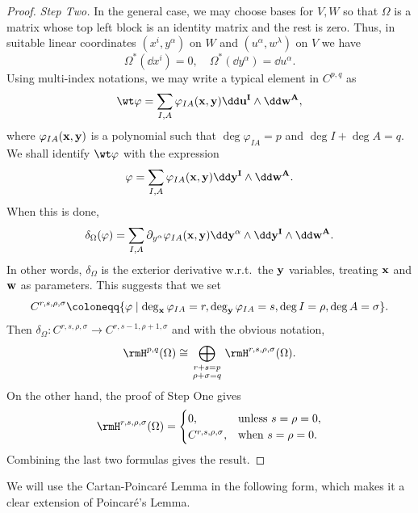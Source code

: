 \begin{proof}
    \emph{Step Two.} In the general case, we may choose bases for $V,W$ so that $\Omega$ is a matrix whose top left block is an identity matrix and the rest is zero. Thus, in suitable linear coordinates $(x^i,y^\alpha)$ on $W$ and $(u^\alpha,w^\lambda)$ on $V$ we have 
    \[\Omega^\ast(\dd x^i)=0,\quad \Omega^\ast(\dd y^\alpha)=\dd u^\alpha.\]
    Using multi-index notations, we may write a typical element in $C^{p,q}$ as 
    \[\wt\varphi=\sum_{I,A}\varphi_{IA}(\bf{x},\bf{y})\dd \bf{u}^I\wedge\dd \bf{w}^A,\]
    where $\varphi_{IA}(\bf{x},\bf{y})$ is a polynomial such that $\deg\varphi_{IA}=p$ and $\deg I+\deg A=q$. We shall identify $\wt\varphi$ with the expression 
    \[\varphi=\sum_{I,A}\varphi_{IA}(\bf{x},\bf{y})\dd \bf{y}^I\wedge\dd \bf{w}^A.\]
    When this is done, 
    \[\delta_\Omega(\varphi)=\sum_{I,A}\partial_{y^\alpha}\varphi_{IA}(\bf{x},\bf{y})\dd y^\alpha\wedge\dd \bf{y}^I\wedge\dd \bf{w}^A.\]
    In other words, $\delta_\Omega$ is the exterior derivative w.r.t.\ the $\bf{y}$ variables, treating $\bf{x}$ and $\bf{w}$ as parameters. This suggests that we set 
    \[C^{r,s,\rho,\sigma}\coloneqq \{\varphi\mid \deg_{\bf{x}}\varphi_{IA}=r,\deg_{\bf{y}}\varphi_{IA}=s,\deg I=\rho,\deg A=\sigma\}.\]
    Then $\delta_\Omega:C^{r,s,\rho,\sigma}\to C^{r,s-1,\rho+1,\sigma}$ and with the obvious notation, 
    \[\rmH^{p,q}(\Omega)\cong \bigoplus_{
        \begin{smallmatrix}
            r+s=p\\
            \rho+\sigma=q
        \end{smallmatrix}}\rmH^{r,s,\rho,\sigma}(\Omega).\]
        On the other hand, the proof of Step One gives 
        \[\rmH^{r,s,\rho,\sigma}(\Omega)=\begin{cases}
            0, & \text{unless }s=\rho=0,\\
            C^{r,s,\rho,\sigma}, & \text{when }s=\rho=0.
        \end{cases}\]
        Combining the last two formulas gives the result.
\end{proof}

We will use the Cartan-Poincar\'e Lemma in the following form, which makes it a clear extension of Poincar\'e's Lemma.

